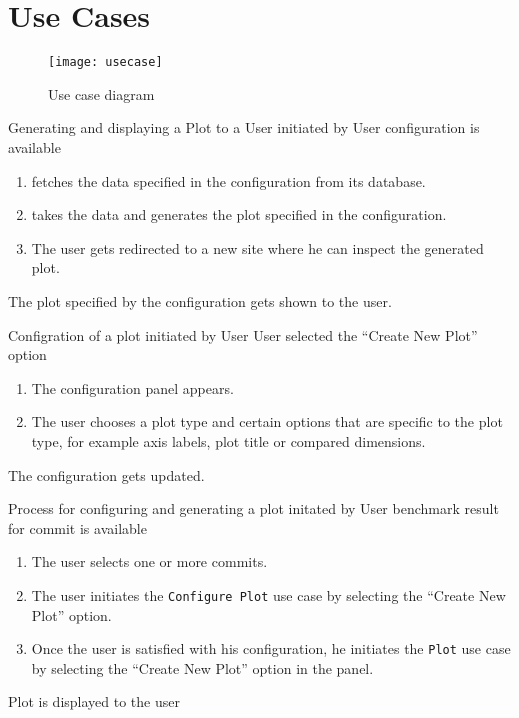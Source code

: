 \section{Use Cases}

\begin{figure}[H]
    \texttt{[image: usecase]}
    \caption{Use case diagram}
    \label{fig:usecase}
\end{figure}

{Generating and displaying a Plot to a User}
{initiated by User}
{\gls{configuration} is available}
{\begin{enumerate}
    \item \parkview{} fetches the data specified in the \gls{configuration} from its database.
    \item \parkview{} takes the data and generates the \gls{plot} specified in the \gls{configuration}.
    \item The user gets redirected to a new site where he can inspect the generated \gls{plot}.
\end{enumerate}}
{The \gls{plot} specified by the \gls{configuration} gets shown to the user.}

\bigskip

{Configration of a \gls{plot}}
{initiated by User}
{User selected the \enquote{Create New Plot} option}
{\begin{enumerate}
    \item The configuration panel appears.
    \item The user chooses a \gls{plot type} and certain options that are specific to the \gls{plot type}, for example axis labels, plot title or compared dimensions.
\end{enumerate}}
{The \gls{configuration} gets updated.}

\bigskip

{Process for configuring and generating a plot}
{initated by User}
{\Gls{benchmark result} for commit is available}
{\begin{enumerate}
    \item The user selects one or more commits.
    \item The user initiates the \texttt{Configure Plot} use case by selecting the \enquote{Create New Plot} option.
    \item Once the user is satisfied with his \gls{configuration}, he initiates the \texttt{Plot} use case by selecting the \enquote{Create New Plot} option in the panel.
\end{enumerate}}
{Plot is displayed to the user}

